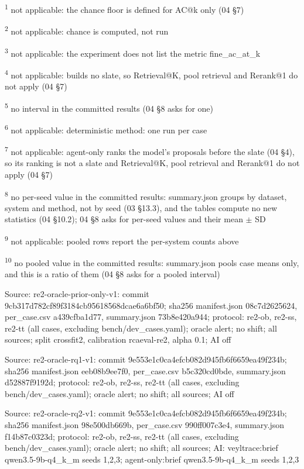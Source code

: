 \par\raggedright\noindent
\textsuperscript{1} not applicable: the chance floor is defined for AC@k only (04 \S{}7)\par
\textsuperscript{2} not applicable: chance is computed, not run\par
\textsuperscript{3} not applicable: the experiment does not list the metric fine\_ac\_at\_k\par
\textsuperscript{4} not applicable: builds no slate, so Retrieval@K, pool retrieval and Rerank@1 do not apply (04 \S{}7)\par
\textsuperscript{5} no interval in the committed results (04 \S{}8 asks for one)\par
\textsuperscript{6} not applicable: deterministic method: one run per case\par
\textsuperscript{7} not applicable: agent-only ranks the model's proposals before the slate (04 \S{}4), so its ranking is not a slate and Retrieval@K, pool retrieval and Rerank@1 do not apply (04 \S{}7)\par
\textsuperscript{8} no per-seed value in the committed results: summary.json groups by dataset, system and method, not by seed (03 \S{}13.3), and the tables compute no new statistics (04 \S{}10.2); 04 \S{}8 asks for per-seed values and their mean $\pm$ SD\par
\textsuperscript{9} not applicable: pooled rows report the per-system counts above\par
\textsuperscript{10} no pooled value in the committed results: summary.json pools case means only, and this is a ratio of them (04 \S{}8 asks for a pooled interval)\par
\noindent Source: re2-oracle-prior-only-v1: commit 9cb317d782cf89f3184cb95618568dcae6a6bf50; sha256 manifest.json 08c7d2625624, per\_case.csv a439cfba1d77, summary.json 73b8e420a944; protocol: re2-ob, re2-ss, re2-tt (all cases, excluding bench/\allowbreak{}dev\_cases.yaml); oracle alert; no shift; all sources; split crossfit2, calibration rcaeval-re2, alpha 0.1; AI off\par
\noindent Source: re2-oracle-rq1-v1: commit 9e553e1c0ca4efcb082d945fb6f6659ea49f234b; sha256 manifest.json eeb08b9ee7f0, per\_case.csv b5c320cd0bde, summary.json d52887f9192d; protocol: re2-ob, re2-ss, re2-tt (all cases, excluding bench/\allowbreak{}dev\_cases.yaml); oracle alert; no shift; all sources; AI off\par
\noindent Source: re2-oracle-rq2-v1: commit 9e553e1c0ca4efcb082d945fb6f6659ea49f234b; sha256 manifest.json 98e500db669b, per\_case.csv 990ff007c3e4, summary.json f14b87c0323d; protocol: re2-ob, re2-ss, re2-tt (all cases, excluding bench/\allowbreak{}dev\_cases.yaml); oracle alert; no shift; all sources; AI: veyltrace:brief qwen3.5-9b-q4\_k\_m seeds 1,2,3; agent-only:brief qwen3.5-9b-q4\_k\_m seeds 1,2,3\par

